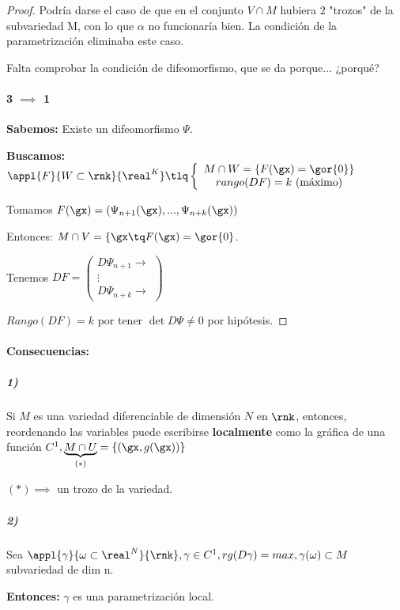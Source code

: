 \begin{proof}
Podría darse el caso de que en el conjunto $V\cap M$ hubiera 2 "trozos" de la subvariedad M, con lo que $\alpha$ no funcionaría bien. La condición de la parametrización eliminaba este caso.

Falta comprobar la condición de difeomorfismo, que se da porque... ¿porqué?

\paragraph{3 $\implies$ 1}

\textbf{Sabemos:} Existe un difeomorfismo $\Psi$.

\textbf{Buscamos:} $\appl{F}{W\subset \rnk}{\real^K} \tlq \displaystyle \left\{\begin{array}{c}
M\cap W = \{F(\gx) = \gor{0}\}\\
rango(DF) = k \text{ (máximo)}
\end{array}\right.$

Tomamos $F(\gx) = (\Psi_{n+1}(\gx),...,\Psi_{n+k}(\gx))$

Entonces: $M\cap V = \{ \gx \tq F(\gx) = \gor{0}$.

Tenemos $DF = \begin{pmatrix}
D\Psi_{n+1} \rightarrow\\
\vdots\\
D\Psi_{n+k} \rightarrow
\end{pmatrix}$

$Rango(DF) = k$ por tener $\det D\Psi \neq 0$ por hipótesis.

\end{proof}

\paragraph{Consecuencias:}

\subparagraph{1)}
Si $M$ es una variedad diferenciable de dimensión $N$ en $\rnk$, entonces, reordenando las variables puede escribirse \textbf{localmente} como la gráfica de una función $C^1, \underbrace{M\cap U}_{(*)} = \{(\gx,g(\gx))\}$

$(*) \implies$ un trozo de la variedad.


\subparagraph{2)}

\begin{theorem}
Sea  $\appl{\gamma}{\omega\subset\real^N}{\rnk}, \gamma \in C^1, rg(D\gamma) = max, \gamma(\omega)\subset M$ subvariedad de dim n.

\textbf{Entonces:} $\gamma$ es una parametrización local.	
\end{theorem}


